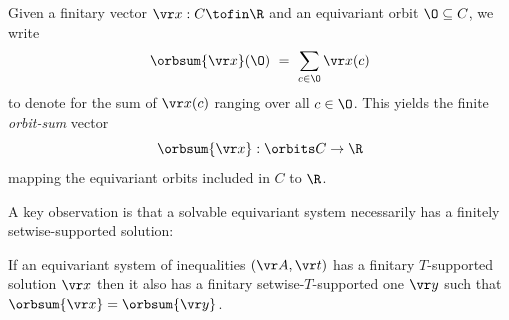 \begin{notation} \label{not:orbsum}
Given a finitary vector $\vr x : C\tofin\R$ and an equivariant orbit $\O\subseteq C$, 
we write
\[
\orbsum {\vr x}(\O) \ = \ \sum_{c\in \O} \vr x(c)
\]
to denote for the sum of $\vr x(c)$ ranging over all $c\in \O$.
This yields the finite \emph{orbit-sum} vector
\[
\orbsum {\vr x} : \orbits C \to \R
\]
mapping the equivariant orbits included in $C$ to $\R$.
\end{notation}

A key observation is that a solvable equivariant system necessarily has a finitely setwise-supported solution:
%
\begin{lemma} \label{lem:weaksol}
If an equivariant system of inequalities $(\vr A, \vr t)$ has a finitary $T$-supported solution 
$\vr x$ then it also has a finitary
setwise-$T$-supported one $\vr y$ such that
$\orbsum{\vr x} = \orbsum{\vr y}$.
\end{lemma}
%
%
